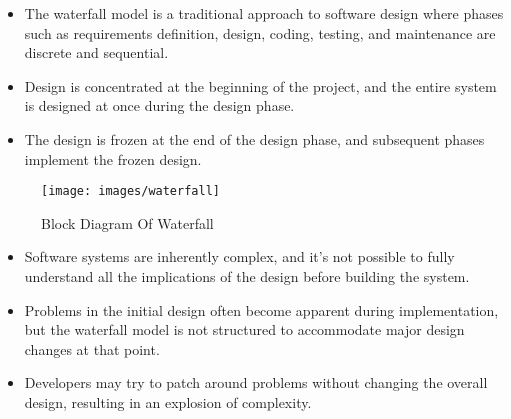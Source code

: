 
{ 
	
	
	\begin{itemize}
		\item The waterfall model is a traditional approach to software design where phases such as requirements definition, design, coding, testing, and maintenance are discrete and sequential. 
		
	\item	Design is concentrated at the beginning of the project, and the entire system is designed at once during the design phase.
		
	\item	The design is frozen at the end of the design phase, and subsequent phases implement the frozen design.\autocite{petersen2009waterfall}
		
		
	\end{itemize}
}
\medskip
{
	\begin{figure}[ht]
		\centering
		
		
		\texttt{[image: images/waterfall]}
		\caption{Block Diagram Of Waterfall}
	\end{figure}
	
}


{ 
	
	
	\begin{itemize}
		\item Software systems are inherently complex, and it's not possible to fully understand all the implications of the design before building the system.
		
		\item	Problems in the initial design often become apparent during implementation, but the waterfall model is not structured to accommodate major design changes at that point.
		
		\item	Developers may try to patch around problems without changing the overall design, resulting in an explosion of complexity.
		
		
		
		
	\end{itemize}
}


